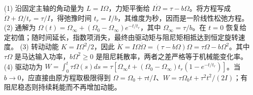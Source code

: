 (1) 沿固定主轴的角动量为 \(L=I\Omega\)，力矩平衡给 \(I\dot\Omega=\tau-b\Omega\)。将方程写成 \(\dot\Omega+\Omega/t_r=\tau/I\)，得弛豫时间 \(t_r=I/b\)，其维度为秒，因而是一阶线性松弛方程。
(2) 通解为 \(\Omega(t)=\Omega_\infty+(\Omega_0-\Omega_\infty)e^{-t/t_r}\)，其中 \(\Omega_\infty=\tau/b\)。在 \(t=0\) 恢复给定初值；随时间延长，指数项消失，最终由驱动矩与阻尼矩相抵达到恒定旋转速度。
(3) 转动动能 \(K=I\Omega^2/2\)，因此 \(\dot K=I\Omega\dot\Omega=(\tau-b\Omega)\Omega=\tau\Omega-b\Omega^2\)。其中 \(\tau\Omega\) 是马达输入功率，\(b\Omega^2\ge0\) 是阻尼耗散率，两者之差严格等于机械能变化率。
(4) 驱动功为 \(W=\int_0^t\tau\Omega(s)ds=\tau[\Omega_\infty t+(\Omega_0-\Omega_\infty)t_r(1-e^{-t/t_r})]\)。当 \(b\to0\)，应直接由原方程取极限得到 \(\Omega=\Omega_0+\tau t/I\)、\(W=\tau\Omega_0t+\tau^2t^2/(2I)\)；有阻尼稳态则持续耗能而不再增加动能。
